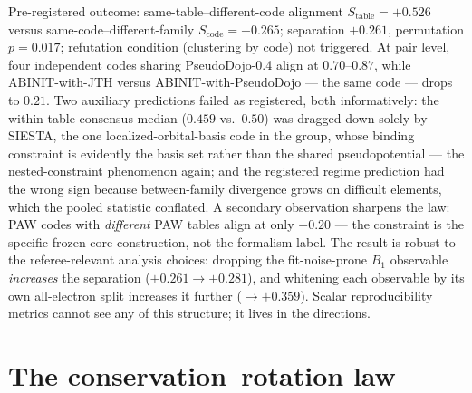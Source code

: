 \documentclass[11pt]{article}
\begin{document}
Pre-registered outcome: same-table--different-code alignment
$S_{\mathrm{table}} = +0.526$ versus same-code--different-family
$S_{\mathrm{code}} = +0.265$; separation $+0.261$, permutation $p = 0.017$;
refutation condition (clustering by code) not triggered. At pair level, four
independent codes sharing PseudoDojo-0.4 align at $0.70$--$0.87$, while
ABINIT-with-JTH versus ABINIT-with-PseudoDojo --- the same code --- drops to
$0.21$. Two auxiliary predictions failed as registered, both informatively:
the within-table consensus median ($0.459$ vs.\ $0.50$) was dragged down
solely by SIESTA, the one localized-orbital-basis code in the group, whose
binding constraint is evidently the basis set rather than the shared
pseudopotential --- the nested-constraint phenomenon again; and the registered
regime prediction had the wrong sign because between-family divergence grows
on difficult elements, which the pooled statistic conflated. A secondary
observation sharpens the law: PAW codes with \emph{different} PAW tables align
at only $+0.20$ --- the constraint is the specific frozen-core construction,
not the formalism label. The result is robust to the referee-relevant
analysis choices: dropping the fit-noise-prone $B_1$ observable
\emph{increases} the separation ($+0.261 \to +0.281$), and whitening each
observable by its own all-electron split increases it further ($\to +0.359$).
Scalar reproducibility metrics
\citep{lejaeghere2016,bosoni2024} cannot see any of this structure; it lives
in the directions.

\section{The conservation--rotation law}
\label{sec:law}
\end{document}
